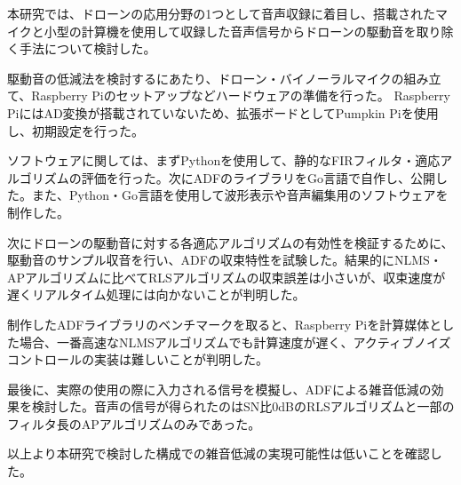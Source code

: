 \begin{jabstract}
本研究では、ドローンの応用分野の1つとして音声収録に着目し、搭載されたマイクと小型の計算機を使用して収録した音声信号からドローンの駆動音を取り除く手法について検討した。

駆動音の低減法を検討するにあたり、ドローン・バイノーラルマイクの組み立て、Raspberry
Piのセットアップなどハードウェアの準備を行った。 Raspberry
PiにはAD変換が搭載されていないため、拡張ボードとしてPumpkin
Piを使用し、初期設定を行った。

ソフトウェアに関しては、まずPythonを使用して、静的なFIRフィルタ・適応アルゴリズムの評価を行った。次にADFのライブラリをGo言語で自作し、公開した。また、Python・Go言語を使用して波形表示や音声編集用のソフトウェアを制作した。

次にドローンの駆動音に対する各適応アルゴリズムの有効性を検証するために、駆動音のサンプル収音を行い、ADFの収束特性を試験した。結果的にNLMS・APアルゴリズムに比べてRLSアルゴリズムの収束誤差は小さいが、収束速度が遅くリアルタイム処理には向かないことが判明した。

制作したADFライブラリのベンチマークを取ると、Raspberry
Piを計算媒体とした場合、一番高速なNLMSアルゴリズムでも計算速度が遅く、アクティブノイズコントロールの実装は難しいことが判明した。

最後に、実際の使用の際に入力される信号を模擬し、ADFによる雑音低減の効果を検討した。音声の信号が得られたのはSN比0dBのRLSアルゴリズムと一部のフィルタ長のAPアルゴリズムのみであった。

以上より本研究で検討した構成での雑音低減の実現可能性は低いことを確認した。
\end{jabstract}
